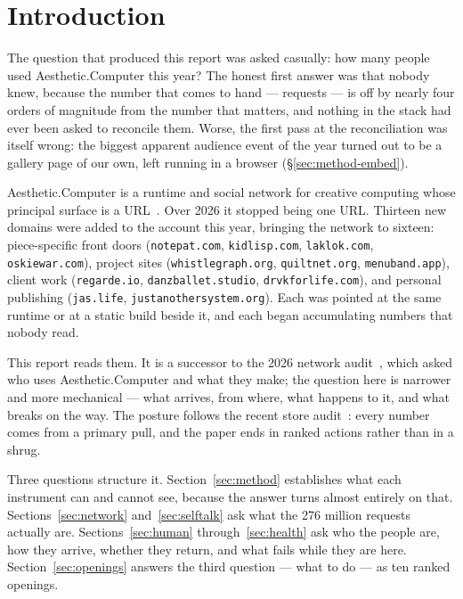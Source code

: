 \documentclass[10pt,letterpaper,twocolumn]{article}
\newcommand{\acdot}{{\color{acpink}.}}
\newcommand{\ac}{Aesthetic{\acdot}Computer}
\begin{document}
\section{Introduction}

The question that produced this report was asked casually: how many
people used \ac{} this year? The honest first answer was that nobody
knew, because the number that comes to hand --- requests --- is off by nearly four orders of magnitude from the number that
matters, and nothing in the stack had ever been asked to reconcile
them. Worse, the first pass at the reconciliation was itself wrong: the
biggest apparent audience event of the year turned out to be a gallery
page of our own, left running in a browser
(\S\ref{sec:method-embed}).

\ac{} is a runtime and social network for creative computing whose
principal surface is a URL~\citep{scudder2026ac,scudder2026url}. Over
2026 it stopped being one URL. Thirteen new domains were added to the
account this year, bringing the network to sixteen: piece-specific
front doors (\texttt{notepat.com}, \texttt{kidlisp.com},
\texttt{laklok.com}, \texttt{oskiewar.com}), project sites
(\texttt{whistlegraph.org}, \texttt{quiltnet.org},
\texttt{menuband.app}), client work (\texttt{regarde.io},
\texttt{danzballet.studio}, \texttt{drvkforlife.com}), and personal
publishing (\texttt{jas.life}, \texttt{justanothersystem.org}).
Each was pointed at the same runtime or at a static build beside it,
and each began accumulating numbers that nobody read.

This report reads them. It is a successor to the 2026 network
audit~\citep{scudder2026audit}, which asked who uses \ac{} and what
they make; the question here is narrower and more mechanical --- what
arrives, from where, what happens to it, and what breaks on the way.
The posture follows the recent store audit~\citep{scudder2026ios}:
every number comes from a primary pull, and the paper ends in ranked
actions rather than in a shrug.

Three questions structure it. Section~\ref{sec:method} establishes what
each instrument can and cannot see, because the answer turns almost
entirely on that. Sections~\ref{sec:network} and~\ref{sec:selftalk} ask
what the 276 million requests actually are.
Sections~\ref{sec:human} through~\ref{sec:health} ask who the people
are, how they arrive, whether they return, and what fails while they
are here. Section~\ref{sec:openings} answers the third question --- what
to do --- as ten ranked openings.
\end{document}
